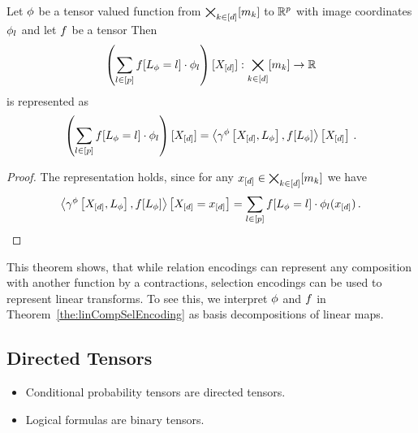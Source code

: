 \begin{theorem}\label{the:linCompSelEncoding}
	Let $\phi$ be a tensor valued function from $\bigtimes_{k\in[d]}[m_{k}]$ to $\mathbb{R}^{p}$ with image coordinates $\phi_l$ and let $f$ be a tensor 
	Then
		\[ \left(\sum_{l\in[p]}f[L_{\phi}=l]\cdot \phi_l \right) [X_{[d]}] : \bigtimes_{k\in[d]}[m_{k}] \rightarrow \mathbb{R} \]
	is represented as
		\[ \left(\sum_{l\in[p]}f[L_{\phi}=l]\cdot \phi_l \right) [X_{[d]}] 
		 = \left\langle \gamma^{\phi}\left[X_{[d]},L_{\phi}\right] , f[L_{\phi}]\right\rangle \left[ X_{[d]} \right] \, . \]
\end{theorem}
\begin{proof}
	The representation holds, since for any $x_{[d]}\in\bigtimes_{k\in[d]}[m_{k}]$ we have
	\begin{align*}
		\left\langle \gamma^{\phi}\left[X_{[d]},L_{\phi}\right] , f[L_{\phi}]\right\rangle \left[ X_{[d]}=x_{[d]} \right]  
		= \sum_{l\in[p]}f[L_{\phi}=l]\cdot\phi_l(x_{[d]}) \, . 
	\end{align*} 
\end{proof}

This theorem shows, that while relation encodings can represent any composition with another function by a contractions, selection encodings can be used to represent linear transforms.
To see this, we interpret $\phi$ and $f$ in Theorem~\ref{the:linCompSelEncoding} as basis decompositions of linear maps.


\subsection{Directed Tensors}

\begin{itemize}
	\item Conditional probability tensors are directed tensors.
	\item Logical formulas are binary tensors.
\end{itemize}


